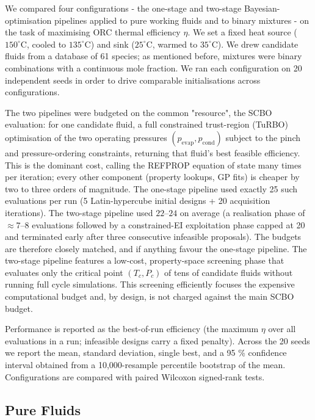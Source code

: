 \documentclass[preprint,12pt]{elsarticle}
\begin{document}
We compared four configurations - the one-stage and two-stage Bayesian-optimisation pipelines applied to pure working fluids and to binary mixtures - on the task of maximising ORC thermal efficiency $\eta$. We set a fixed heat source ($150^{\circ}\text{C}$, cooled to $135^{\circ}\text{C}$) and sink ($25^{\circ}\text{C}$, warmed to $35^{\circ}\text{C}$). We drew candidate fluids from a database of 61 species; as mentioned before, mixtures were binary combinations  with a continuous mole fraction. We ran each configuration on 20 independent seeds in order to drive comparable initialisations across configurations.

The two pipelines were budgeted on the common "resource", the SCBO evaluation: for one candidate fluid, a full constrained trust-region (TuRBO) optimisation of the two operating pressures $(p_\mathrm{evap}, p_\mathrm{cond})$ subject to the pinch and pressure-ordering constraints, returning that fluid's best feasible efficiency. This is the dominant cost, calling the REFPROP equation of state many times per iteration; every other component (property lookups, GP fits) is cheaper by two to three orders of magnitude. The one-stage pipeline used exactly 25 such evaluations per run (5 Latin-hypercube initial designs + 20 acquisition iterations). The two-stage pipeline used $22$–$24$ on average (a realisation phase of $\approx 7$–$8$ evaluations followed by a constrained-EI exploitation phase capped at 20 and terminated early after three consecutive infeasible proposals). The budgets are therefore closely matched, and if anything favour the one-stage pipeline. The two-stage pipeline features a low-cost, property-space screening phase that evaluates only the critical point $(T_c, P_c)$ of tens of candidate fluids without running full cycle simulations. This screening efficiently focuses the expensive computational budget and, by design, is not charged against the main SCBO budget.

Performance is reported as the best-of-run efficiency (the maximum $\eta$ over all evaluations in a run; infeasible designs carry a fixed penalty). Across the 20 seeds we report the mean, standard deviation, single best, and a 95 \% confidence interval obtained from a 10,000-resample percentile bootstrap of the mean. Configurations are compared with paired Wilcoxon signed-rank tests.


\subsection{Pure Fluids}
\label{PF}
\end{document}
